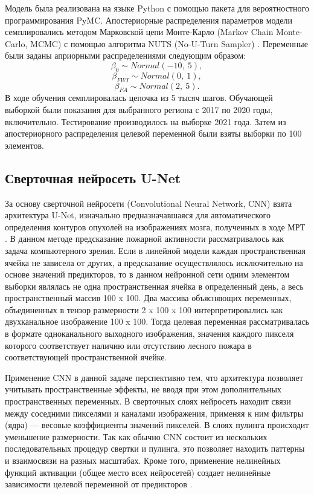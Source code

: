 \documentclass[a4paper,article,14pt]{extarticle}
\begin{document}
Модель была реализована на языке Python с помощью пакета для вероятностного программирования PyMC. Апостериорные распределения параметров модели семплировались методом Марковской цепи Монте-Карло (Markov Chain Monte-Carlo, MCMC) с помощью алгоритма NUTS (No-U-Turn Sampler) \cite{HoffmanNoUTurnSamplerAdaptively2011}. Переменные были заданы априорными распределениями следующим образом:
\begin{equation}
	\beta_0\sim Normal(-10,\ 5),
\end{equation}
\begin{equation}
	\beta_{FWI}\sim Normal(0,\ 1),
\end{equation}
\begin{equation}
	\beta_{FA}\sim Normal(2,\ 5).
\end{equation}
В ходе обучения семплировалась цепочка из 5 тысяч шагов. Обучающей выборкой были показания для выбранного региона с 2017 по 2020 годы, включительно. Тестирование производилось на выборке 2021 года. Затем из апостериорного распределения целевой переменной были взяты выборки по 100 элементов.

\subsection{Сверточная нейросеть U-Net}

За основу сверточной нейросети (Convolutional Neural Network, CNN) взята архитектура U-Net, изначально предназначавшаяся для автоматического определения контуров опухолей на изображениях мозга, полученных в ходе МРТ \cite{RonnebergerUNetConvolutionalNetworks2015}. В данном методе предсказание пожарной активности рассматривалось как задача компьютерного зрения. Если в линейной модели каждая пространственная ячейка не зависела от других, а предсказание осуществлялось исключительно на основе значений предикторов, то в данном нейронной сети одним элементом выборки являлась не одна пространственная ячейка в определенный день, а весь пространственный массив 100 x 100. Два массива объясняющих переменных, объединенных в тензор размерности 2 x 100 x 100 интерпретировались как двухканальное изображение 100 x 100. Тогда целевая переменная рассматривалась в формате одноканального выходного изображения, значения каждого пикселя которого соответствует наличию или отсутствию лесного пожара в соответствующей пространственной ячейке.

Применение CNN в данной задаче перспективно тем, что архитектура позволяет учитывать пространственные эффекты, не вводя при этом дополнительных пространственных переменных. В сверточных слоях нейросеть находит связи между соседними пикселями и каналами изображения, применяя к ним фильтры (ядра) — весовые коэффициенты значений пикселей. В слоях пулинга происходит уменьшение размерности. Так как обычно CNN состоит из нескольких последовательных процедур свертки и пулинга, это позволяет находить паттерны и взаимосвязи на разных масштабах. Кроме того, применение нелинейных функций активации (общее место всех нейросетей) создает нелинейные зависимости целевой переменной от предикторов \cite{LeCunBackpropagationAppliedHandwritten1989}.
\end{document}
